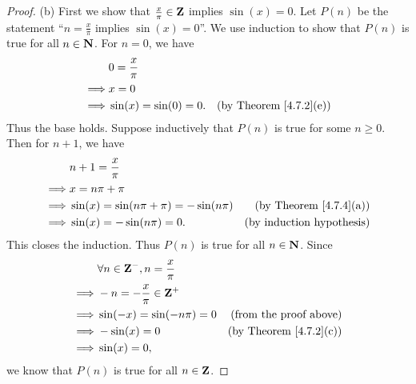 \begin{proof}{(b)}
    First we show that \(\frac{x}{\pi} \in \mathbf{Z}\) implies \(\sin(x) = 0\).
    Let \(P(n)\) be the statement ``\(n = \frac{x}{\pi}\) implies \(\sin(x) = 0\)''.
    We use induction to show that \(P(n)\) is true for all \(n \in \mathbf{N}\).
    For \(n = 0\), we have
    \begin{align*}
                 & 0 = \frac{x}{\pi}                                           \\
        \implies & x = 0                                                       \\
        \implies & \sin(x) = \sin(0) = 0. & \text{(by Theorem \ref{4.7.2}(e))}
    \end{align*}
    Thus the base holds.
    Suppose inductively that \(P(n)\) is true for some \(n \geq 0\).
    Then for \(n + 1\), we have
    \begin{align*}
                 & n + 1 = \frac{x}{\pi}                                                           \\
        \implies & x = n \pi + \pi                                                                 \\
        \implies & \sin(x) = \sin(n \pi + \pi) = -\sin(n \pi) & \text{(by Theorem \ref{4.7.4}(a))} \\
        \implies & \sin(x) = -\sin(n \pi) = 0.                & \text{(by induction hypothesis)}
    \end{align*}
    This closes the induction.
    Thus \(P(n)\) is true for all \(n \in \mathbf{N}\).
    Since
    \begin{align*}
                 & \forall n \in \mathbf{Z}^-, n = \frac{x}{\pi}                                      \\
        \implies & -n = -\frac{x}{\pi} \in \mathbf{Z}^+                                               \\
        \implies & \sin(-x) = \sin(- n \pi) = 0          & \text{(from the proof above)}      \\
        \implies & -\sin(x) = 0                          & \text{(by Theorem \ref{4.7.2}(c))} \\
        \implies & \sin(x) = 0,
    \end{align*}
    we know that \(P(n)\) is true for all \(n \in \mathbf{Z}\).


\end{proof}
